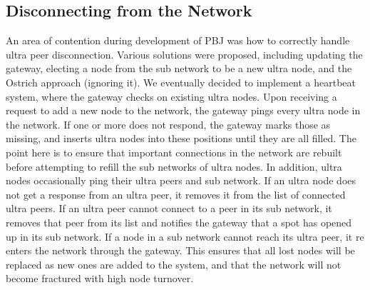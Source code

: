 \documentclass{acm_proc_article-sp}
\begin{document}
\subsection{Disconnecting from the Network}
An area of contention during development of PBJ was how to correctly handle ultra peer disconnection.  Various solutions were proposed, including updating the gateway, electing a node from the sub network to be a new ultra node, and the Ostrich approach (ignoring it).  We eventually decided to implement a heartbeat system, where the gateway checks on existing ultra nodes.  Upon receiving a request to add a new node to the network, the gateway pings every ultra node in the network. If one or more does not respond, the gateway marks those as missing, and inserts ultra nodes into these positions until they are all filled. The point here is to ensure that important connections in the network are rebuilt before attempting to refill the sub networks of ultra nodes. In addition, ultra nodes occasionally ping their ultra peers and sub network.  If an ultra node does not get a response from an ultra peer, it removes it from the list of connected ultra peers.  If an ultra peer cannot connect to a peer in its sub network, it removes that peer from its list and notifies the gateway that a spot has opened up in its sub network.  If a node in a sub network cannot reach its ultra peer, it re enters the network through the gateway.  This ensures that all lost nodes will be replaced as new ones are added to the system, and that the network will not become fractured with high node turnover.  
\end{document}
